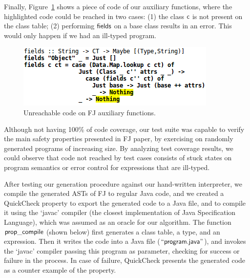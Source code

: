 \documentclass[tese,capa,english]{texufpel}
\newcommand{\V}[1]{\black{\mathsf{#1}}}
\newcommand{\HFun}[1]{\blue{\mathsf{#1}}}
\newcommand{\HS}[1]{\yellow{\mathsf{#1}}}
\begin{document}
Finally, Figure~\ref{fig:fields} shows a piece of code of our auxiliary functions, where the highlighted code could be reached in two cases: (1) the class \ensuremath{\V{c}} is not present on the class table; (2) performing \ensuremath{\HFun{fields}} on a base class results in an error. This would only happen if we had an ill-typed program.

\begin{figure}[!htb]
\centering
\includegraphics[width=0.57\linewidth]{Images/fields_fj}
\caption{Unreachable code on FJ auxiliary functions.}
\label{fig:fields}
\end{figure}

Although not having 100\% of code coverage, our test suite was capable to verify the main safety properties presented in FJ paper, by exercising on randomly generated programs of increasing size. By analyzing test coverage results, we could observe that code not reached by test cases consists of stuck states on program semantics or error control for expressions that are ill-typed. 

After testing our generation procedure against our hand-written interpreter, we compile the generated ASTs of FJ to regular Java code, and we created a QuickCheck property to export the generated code to a Java file, and to compile it using the `javac' compiler (the closest implementation of Java Specification Language), which was assumed as an oracle for our algorithm. The function \ensuremath{\HFun{prop\_compile}} (shown below) first generates a class table, a type, and an expression. Then it writes the code into a Java file (\ensuremath{\HS{\text{``}program.java\text{''}}}), and invokes the `javac' compiler passing this program as parameter, checking for success or failure in the process. In case of failure, QuickCheck presents the generated code as a counter example of the property.
\end{document}

